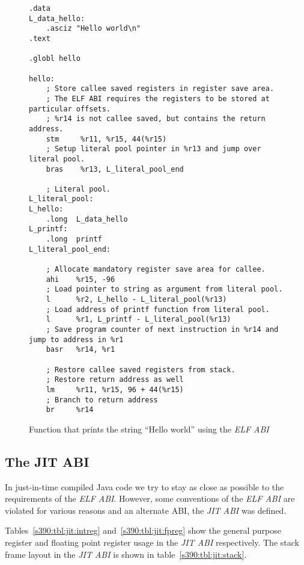 \begin{figure}
\begin{verbatim}
.data
L_data_hello:
    .asciz "Hello world\n"
.text

.globl hello

hello:
    ; Store callee saved registers in register save area.
    ; The ELF ABI requires the registers to be stored at particular offsets.
    ; %r14 is not callee saved, but contains the return address.
    stm     %r11, %r15, 44(%r15)
    ; Setup literal pool pointer in %r13 and jump over literal pool.
    bras    %r13, L_literal_pool_end

	; Literal pool.
L_literal_pool:
L_hello:
    .long  L_data_hello
L_printf:
    .long  printf
L_literal_pool_end:

    ; Allocate mandatory register save area for callee.
    ahi    %r15, -96
    ; Load pointer to string as argument from literal pool.
    l      %r2, L_hello - L_literal_pool(%r13)
    ; Load address of printf function from literal pool.
    l      %r1, L_printf - L_literal_pool(%r13)
    ; Save program counter of next instruction in %r14 and jump to address in %r1
    basr   %r14, %r1

    ; Restore callee saved registers from stack.
    ; Restore return address as well
    lm     %r11, %r15, 96 + 44(%r15)
    ; Branch to return address
    br     %r14
\end{verbatim}
\caption{Function that prints the string ``Hello world'' using the \emph{ELF ABI}}
\label{s390:fig:elf:hello}
\end{figure}

\subsection{The JIT ABI}
\label{s390:sec:jitabi}

In just-in-time compiled Java code we try to stay as close as possible to the requirements of the \emph{ELF ABI}. However, some conventions of the \emph{ELF ABI} are violated for various reasons and an alternate ABI, the \emph{JIT ABI} was defined.

Tables~\ref{s390:tbl:jit:intreg} and~\ref{s390:tbl:jit:fpreg} show the general purpose register and floating point register usage in the \emph{JIT ABI} respectively. The stack frame layout in the \emph{JIT ABI} is shown in table~\ref{s390:tbl:jit:stack}.

